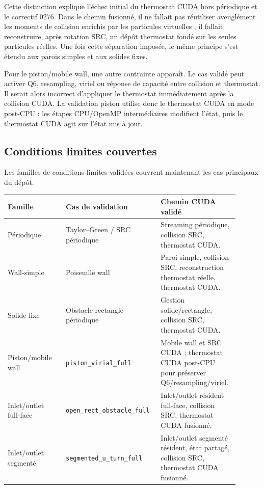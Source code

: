 \documentclass[11pt,a4paper]{article}
\begin{document}
Cette distinction explique l'échec initial du thermostat CUDA hors périodique et le correctif 0276. Dans le chemin fusionné, il ne fallait pas réutiliser aveuglément les moments de collision enrichis par les particules virtuelles ; il fallait reconstruire, après rotation SRC, un dépôt thermostat fondé sur les seules particules réelles. Une fois cette séparation imposée, le même principe s'est étendu aux parois simples et aux solides fixes.

Pour le piston/mobile wall, une autre contrainte apparaît. Le cas validé peut activer Q6, resampling, viriel ou réponse de capacité entre collision et thermostat. Il serait alors incorrect d'appliquer le thermostat immédiatement après la collision CUDA. La validation piston utilise donc le thermostat CUDA en mode post-CPU : les étapes CPU/OpenMP intermédiaires modifient l'état, puis le thermostat CUDA agit sur l'état mis à jour.

\subsection{Conditions limites couvertes}

Les familles de conditions limites validées couvrent maintenant les cas principaux du dépôt.
\begin{center}
\begin{tabular}{p{0.24\linewidth}p{0.36\linewidth}p{0.30\linewidth}}
\toprule
Famille & Cas de validation & Chemin CUDA validé \\
\midrule
Périodique & Taylor--Green / SRC périodique & Streaming périodique, collision SRC, thermostat CUDA. \\
Wall-simple & Poiseuille wall & Paroi simple, collision SRC, reconstruction thermostat réelle, thermostat CUDA. \\
Solide fixe & Obstacle rectangle périodique & Gestion solide/rectangle, collision SRC, thermostat CUDA. \\
Piston/mobile wall & \texttt{piston\_virial\_full} & Mobile wall et SRC CUDA ; thermostat CUDA post-CPU pour préserver Q6/resampling/viriel. \\
Inlet/outlet full-face & \texttt{open\_rect\_obstacle\_full} & Inlet/outlet résident full-face, collision SRC, thermostat CUDA fusionné. \\
Inlet/outlet segmenté & \texttt{segmented\_u\_turn\_full} & Inlet/outlet segmenté résident, état partagé, collision SRC, thermostat CUDA fusionné. \\
\bottomrule
\end{tabular}
\end{center}
\end{document}
